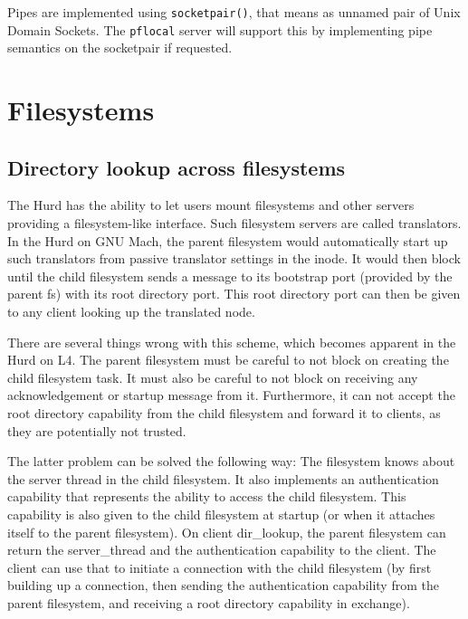 Pipes are implemented using \texttt{socketpair()}, that means as
unnamed pair of Unix Domain Sockets.  The \texttt{pflocal} server will
support this by implementing pipe semantics on the socketpair if
requested.

\begin{comment}
  It was considered to use shared memory for the pipe implementation.
  But we are not aware of a lock-free protocol using shared memory
  with multiple readers and multiple writers.  It might be possible,
  but it is not obvious if that would be faster: Pipes are normally
  used with \texttt{read()} and \texttt{write()}, so the data has to
  be copied from and to the supplied buffer.  This can be done
  efficiently in L4 even across address spaces using string items.  In
  the implementation using sockets, the \texttt{pflocal} server
  handles concurrent read and write accesses with mutual exclusion.
\end{comment}


\section{Filesystems}

\subsection{Directory lookup across filesystems}
\label{xfslookup}

The Hurd has the ability to let users mount filesystems and other
servers providing a filesystem-like interface.  Such filesystem
servers are called translators.  In the Hurd on GNU Mach, the parent
filesystem would automatically start up such translators from passive
translator settings in the inode.  It would then block until the child
filesystem sends a message to its bootstrap port (provided by the
parent fs) with its root directory port.  This root directory port can
then be given to any client looking up the translated node.

There are several things wrong with this scheme, which becomes
apparent in the Hurd on L4.  The parent filesystem must be careful to
not block on creating the child filesystem task.  It must also be
careful to not block on receiving any acknowledgement or startup
message from it.  Furthermore, it can not accept the root directory
capability from the child filesystem and forward it to clients, as
they are potentially not trusted.

The latter problem can be solved the following way: The filesystem
knows about the server thread in the child filesystem.  It also
implements an authentication capability that represents the ability to
access the child filesystem.  This capability is also given to the
child filesystem at startup (or when it attaches itself to the parent
filesystem).  On client dir\_lookup, the parent filesystem can return
the server\_thread and the authentication capability to the client.
The client can use that to initiate a connection with the child
filesystem (by first building up a connection, then sending the
authentication capability from the parent filesystem, and receiving a
root directory capability in exchange).

